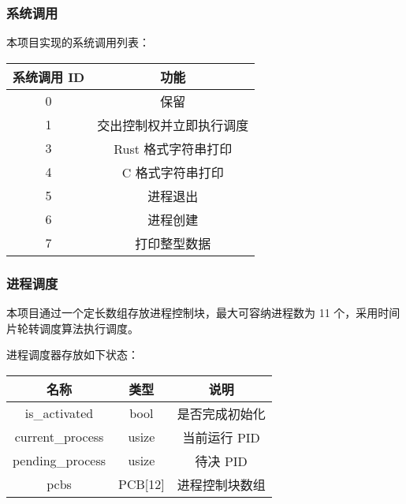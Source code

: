 \documentclass[aspectratio=169]{beamer}
\begin{document}
\begin{frame}
    \frametitle{系统调用}

    本项目实现的系统调用列表：

    \begin{center}
        \begin{tabular}{ |c|c| }
            \hline
            \textbf{系统调用 ID} & \textbf{功能} \\ \hline
            0 & 保留 \\
            1 & 交出控制权并立即执行调度 \\
            3 & Rust 格式字符串打印 \\ 
            4 & C 格式字符串打印 \\
            5 & 进程退出 \\
            6 & 进程创建 \\
            7 & 打印整型数据 \\ \hline
        \end{tabular}
    \end{center}
    
\end{frame}

\begin{frame}

    \frametitle{进程调度}

    本项目通过一个定长数组存放进程控制块，最大可容纳进程数为 11 个，采用时间片轮转调度算法执行调度。

    \par

    进程调度器存放如下状态：

    \begin{center}
        \begin{tabular}{ |c|c|c| }
            \hline
            \textbf{名称} & \textbf{类型} & \textbf{说明} \\ \hline
            is\_activated & bool & 是否完成初始化 \\ 
            current\_process & usize & 当前运行 PID \\ 
            pending\_process & usize & 待决 PID \\ 
            pcbs & PCB[12] & 进程控制块数组 \\ \hline
        \end{tabular}
    \end{center}
    
\end{frame}
\end{document}
